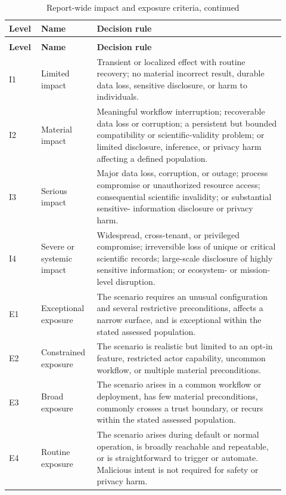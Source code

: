 \documentclass[../main.tex]{subfiles}
\begin{document}
\begingroup
\small
\setlength{\tabcolsep}{3pt}
\renewcommand{\arraystretch}{1.15}
\begin{longtable}{@{}p{0.10\linewidth}>{\raggedright\arraybackslash}p{0.18\linewidth}p{0.64\linewidth}@{}}
\caption{Report-wide impact and exposure criteria}
\label{tab:risk-factor-criteria}\\
\hline
\textbf{Level} & \textbf{Name} & \textbf{Decision rule} \\
\hline
\endfirsthead

\caption[]{Report-wide impact and exposure criteria, continued}\\
\hline
\textbf{Level} & \textbf{Name} & \textbf{Decision rule} \\
\hline
\endhead

\hline
\endfoot

\hline
\endlastfoot

I1 & Limited impact &
Transient or localized effect with routine recovery; no material incorrect
result, durable data loss, sensitive disclosure, or harm to individuals. \\

I2 & Material impact &
Meaningful workflow interruption; recoverable data loss or corruption; a
persistent but bounded compatibility or scientific-validity problem; or
limited disclosure, inference, or privacy harm affecting a defined population. \\

I3 & Serious impact &
Major data loss, corruption, or outage; process compromise or unauthorized
resource access; consequential scientific invalidity; or substantial sensitive-
information disclosure or privacy harm. \\

I4 & Severe or systemic impact &
Widespread, cross-tenant, or privileged compromise; irreversible loss of unique
or critical scientific records; large-scale disclosure of highly sensitive
information; or ecosystem- or mission-level disruption. \\

E1 & Exceptional exposure &
The scenario requires an unusual configuration and several restrictive
preconditions, affects a narrow surface, and is exceptional within the stated
assessed population. \\

E2 & Constrained exposure &
The scenario is realistic but limited to an opt-in feature, restricted actor
capability, uncommon workflow, or multiple material preconditions. \\

E3 & Broad exposure &
The scenario arises in a common workflow or deployment, has few material
preconditions, commonly crosses a trust boundary, or recurs within the stated
assessed population. \\

E4 & Routine exposure &
The scenario arises during default or normal operation, is broadly reachable
and repeatable, or is straightforward to trigger or automate. Malicious intent
is not required for safety or privacy harm. \\

\end{longtable}
\endgroup
\end{document}
